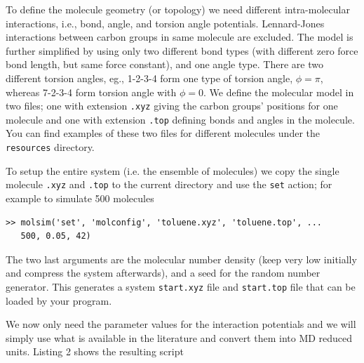 \documentclass[11pt]{article}
\begin{document}
To define the molecule geometry (or topology) we need different intra-molecular
interactions, i.e., bond, angle, and torsion angle potentials. Lennard-Jones
interactions between carbon groups in same molecule are excluded. The model is
further simplified by using only two different bond types (with different zero
force bond length, but same force constant), and one angle type. There are two
different torsion angles, eg., 1-2-3-4 form one type of torsion angle,
$\phi=\pi$, whereas 7-2-3-4 form torsion angle with $\phi=0$. We define the
molecular model in two files; one with extension \verb!.xyz! giving the carbon
groups' positions for one molecule and one with extension \verb!.top!  defining
bonds and angles in the molecule. You can find examples of these two files for
different molecules under the \verb!resources!  directory.

To setup the entire system (i.e. the ensemble of molecules) we copy the single
molecule \verb!.xyz!  and \verb!.top! to the current directory and use the
\verb!set!  action; for example to simulate 500 molecules
\begin{verbatim}
>> molsim('set', 'molconfig', 'toluene.xyz', 'toluene.top', ... 
   500, 0.05, 42)
\end{verbatim}
The two last arguments are the molecular number density (keep very low initially
and compress the system afterwards), and a seed for the random number
generator. This generates a system \verb!start.xyz! file and \verb!start.top!
file that can be loaded by your program. 

We now only need the parameter values for the interaction potentials and we will
simply use what is available in the literature \cite{Hansen} and convert them
into MD reduced units. Listing 2 shows the resulting script

\bigskip
\end{document}
